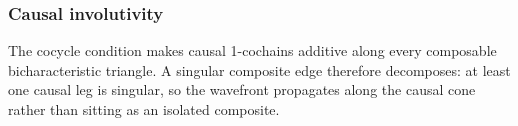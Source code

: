 \subsubsection{Causal involutivity}

\begin{theorem}\label{thm:causal-involutivity}\leanok{}
The cocycle condition makes causal 1-cochains additive along every composable
bicharacteristic triangle. A singular composite edge therefore decomposes:
at least one causal leg is singular, so the wavefront propagates along the
causal cone rather than sitting as an isolated composite.
\end{theorem}
